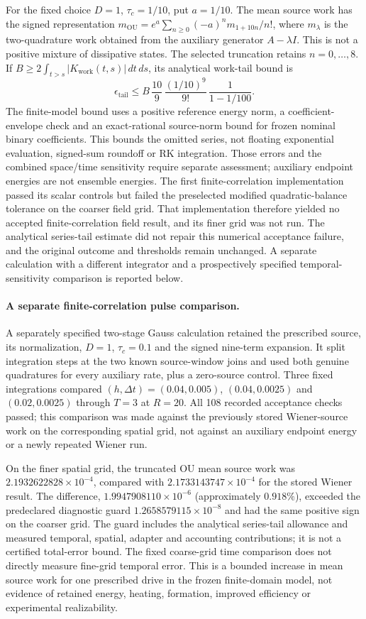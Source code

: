 For the fixed choice $D=1$, $\tau_c=1/10$, put $a=1/10$.
The mean source work has the signed representation
$m_{\mathrm{OU}}=e^a\sum_{n\ge0}(-a)^n m_{1+10n}/n!$, where $m_\lambda$
is the two-quadrature work obtained from the auxiliary generator
$A-\lambda I$. This is not a positive mixture of dissipative states.
The selected truncation retains $n=0,\ldots,8$. If
$B\ge2\int_{t>s}|K_{\mathrm{work}}(t,s)|\,dt\,ds$, its analytical work-tail
bound is
\[
 \epsilon_{\mathrm{tail}}\le
 B\,\frac{10}{9}\,\frac{(1/10)^9}{9!}\,\frac{1}{1-1/100}.
\]
The finite-model bound uses a positive reference energy norm,
a coefficient-envelope check and an exact-rational source-norm bound
for frozen nominal binary coefficients. This bounds the omitted series,
not floating exponential evaluation, signed-sum roundoff or RK integration.
Those errors and the combined space/time sensitivity require separate
assessment; auxiliary endpoint energies are not ensemble energies.
The first finite-correlation implementation passed its scalar controls but
failed the preselected modified quadratic-balance tolerance on the coarser
field grid. That implementation therefore yielded no accepted finite-correlation
field result, and its finer grid was not run. The analytical series-tail estimate
did not repair this numerical acceptance failure, and the original outcome
and thresholds remain unchanged. A separate calculation with a different
integrator and a prospectively specified temporal-sensitivity comparison is
reported below.

\paragraph{A separate finite-correlation pulse comparison.}
A separately specified two-stage Gauss calculation retained the prescribed
source, its normalization, $D=1$, $\tau_c=0.1$ and the signed nine-term expansion.
It split integration steps at the two known source-window joins and used
both genuine quadratures for every auxiliary rate, plus a zero-source
control. Three fixed integrations compared $(h,\Delta t)=(0.04,0.005)$,
$(0.04,0.0025)$ and $(0.02,0.0025)$ through $T=3$ at $R=20$.
All 108 recorded acceptance checks passed; this comparison was made against
the previously stored Wiener-source work on the corresponding spatial grid,
not against an auxiliary endpoint energy or a newly repeated Wiener run.

On the finer spatial grid, the truncated OU mean source work was
$2.1932622828\times10^{-4}$, compared with $2.1733143747\times10^{-4}$
for the stored Wiener result. The difference, $1.9947908110\times10^{-6}$
(approximately $0.918\%$), exceeded the predeclared diagnostic guard
$1.2658579115\times10^{-8}$ and had the same positive sign on the coarser grid.
The guard includes the analytical series-tail allowance and measured temporal,
spatial, adapter and accounting contributions; it is not a certified total-error
bound. The fixed coarse-grid time comparison does not directly measure fine-grid
temporal error. This is a bounded increase in mean source work for one prescribed
drive in the frozen finite-domain model, not evidence of retained energy,
heating, formation, improved efficiency or experimental realizability.

